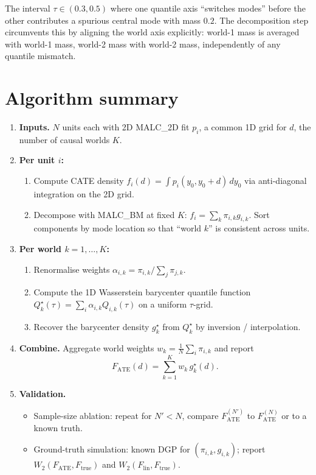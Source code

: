 \documentclass[11pt]{article}
\newcommand{\W}{W}
\newcommand{\Fate}{F_{\mathrm{ATE}}}
\newcommand{\Flin}{F_{\mathrm{lin}}}
\begin{document}
The interval $\tau \in (0.3, 0.5)$ where one quantile axis ``switches modes'' before the other contributes a spurious central mode with mass $0.2$. The decomposition step circumvents this by aligning the world axis explicitly: world-1 mass is averaged with world-1 mass, world-2 mass with world-2 mass, independently of any quantile mismatch.

\section{Algorithm summary}

\begin{enumerate}[leftmargin=*]
\item \textbf{Inputs.} $N$ units each with 2D MALC\_2D fit $p_i$, a common 1D grid for $d$, the number of causal worlds $K$.

\item \textbf{Per unit $i$:}
\begin{enumerate}
  \item Compute CATE density $f_i(d) = \int p_i(y_0, y_0 + d)\, dy_0$ via anti-diagonal integration on the 2D grid.
  \item Decompose with MALC\_BM at fixed $K$: $f_i = \sum_k \pi_{i,k} g_{i,k}$. Sort components by mode location so that ``world $k$'' is consistent across units.
\end{enumerate}

\item \textbf{Per world $k = 1, \dots, K$:}
\begin{enumerate}
  \item Renormalise weights $\alpha_{i,k} = \pi_{i,k} / \sum_j \pi_{j,k}$.
  \item Compute the 1D Wasserstein barycenter quantile function $Q_k^\star(\tau) = \sum_i \alpha_{i,k} Q_{i,k}(\tau)$ on a uniform $\tau$-grid.
  \item Recover the barycenter density $g_k^\star$ from $Q_k^\star$ by inversion / interpolation.
\end{enumerate}

\item \textbf{Combine.} Aggregate world weights $w_k = \frac{1}{N}\sum_i \pi_{i,k}$ and report
\[
  \Fate(d) = \sum_{k=1}^{K} w_k\, g_k^\star(d).
\]

\item \textbf{Validation.}
\begin{itemize}
  \item Sample-size ablation: repeat for $N' < N$, compare $\Fate^{(N')}$ to $\Fate^{(N)}$ or to a known truth.
  \item Ground-truth simulation: known DGP for $(\pi_{i,k}, g_{i,k})$; report $\W_2(\Fate, F_{\mathrm{true}})$ and $\W_2(\Flin, F_{\mathrm{true}})$.
\end{itemize}
\end{enumerate}
\end{document}
